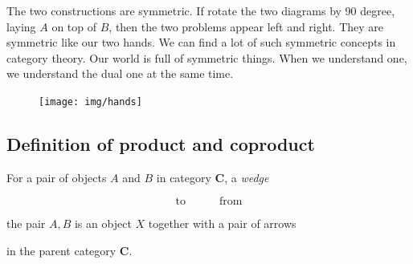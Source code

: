 \documentclass[b5paper]{article}
\begin{document}
\begin{center}
\end{center}

The two constructions are symmetric. If rotate the two diagrams by 90 degree, laying $A$ on top of $B$, then the two problems appear left and right. They are symmetric like our two hands. We can find a lot of such symmetric concepts in category theory. Our world is full of symmetric things. When we understand one, we understand the dual one at the same time.

\begin{figure}[htbp]
 \centering
 \texttt{[image: img/hands]}
 \captionsetup{labelformat=empty}
 \caption{}
 \label{fig:hands}
\end{figure}

\subsection{Definition of product and coproduct}
 
\begin{definition}
\normalfont
For a pair of objects $A$ and $B$ in category $\pmb{C}$, a {\em wedge}

\[
\text{to} \quad \quad \quad \text{from}
\]

the pair $A, B$ is an object $X$ together with a pair of arrows

\begin{center}
\end{center}

in the parent category $\pmb{C}$.
\end{definition}
\end{document}
